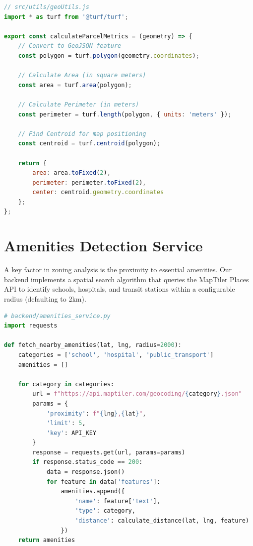 \documentclass[12pt,a4paper]{report}
\begin{document}
\begin{lstlisting}[language=JavaScript, caption=Client-Side Area Calculation]
// src/utils/geoUtils.js
import * as turf from '@turf/turf';

export const calculateParcelMetrics = (geometry) => {
    // Convert to GeoJSON feature
    const polygon = turf.polygon(geometry.coordinates);
    
    // Calculate Area (in square meters)
    const area = turf.area(polygon);
    
    // Calculate Perimeter (in meters)
    const perimeter = turf.length(polygon, { units: 'meters' });
    
    // Find Centroid for map positioning
    const centroid = turf.centroid(polygon);
    
    return {
        area: area.toFixed(2),
        perimeter: perimeter.toFixed(2),
        center: centroid.geometry.coordinates
    };
};
\end{lstlisting}

\section{Amenities Detection Service}
A key factor in zoning analysis is the proximity to essential amenities. Our backend implements a spatial search algorithm that queries the MapTiler Places API to identify schools, hospitals, and transit stations within a configurable radius (defaulting to 2km).

\begin{lstlisting}[language=Python, caption=Amenities Search Logic]
# backend/amenities_service.py
import requests

def fetch_nearby_amenities(lat, lng, radius=2000):
    categories = ['school', 'hospital', 'public_transport']
    amenities = []
    
    for category in categories:
        url = f"https://api.maptiler.com/geocoding/{category}.json"
        params = {
            'proximity': f"{lng},{lat}",
            'limit': 5,
            'key': API_KEY
        }
        response = requests.get(url, params=params)
        if response.status_code == 200:
            data = response.json()
            for feature in data['features']:
                amenities.append({
                    'name': feature['text'],
                    'type': category,
                    'distance': calculate_distance(lat, lng, feature)
                })
    return amenities
\end{lstlisting}
\end{document}

